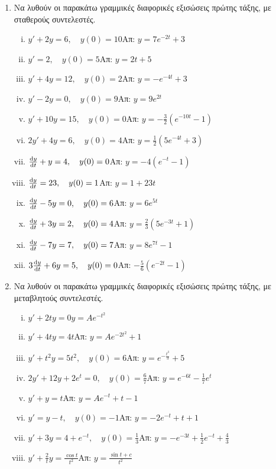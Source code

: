 \documentclass[a4paper,12pt]{article}
\begin{document}
\begin{center}
\end{center}

\vspace{\baselineskip}


\begin{enumerate}

\item Να λυθούν οι παρακάτω γραμμικές διαφορικές εξισώσεις πρώτης τάξης, με σταθερούς συντελεστές.

\begin{enumerate}[i)]

\item $y'+2y=6,\quad y(0)=10$\hfill Απ: $y=7e^{-2t}+3$
\item $y'=2,\quad y(0)=5$\hfill Απ: $y=2t+5$
\item $y'+4y=12,\quad y(0)=2$\hfill Απ: $y=-e^{-4t}+3$
\item $y'-2y=0,\quad y(0)=9$\hfill Απ: $y=9e^{2t}$
\item $y'+10y=15,\quad y(0)=0$\hfill Απ: $y=-\frac{3}{2}(e^{-10t}-1)$
\item $2y'+4y=6,\quad y(0)=4$\hfill Απ: $y=\frac{1}{2}(5e^{-4t}+3)$
\item $\dv{y}{t}+y=4,\quad y(0)=0$\hfill Απ: $y=-4(e^{-t}-1)$
\item $\dv{y}{t}=23,\quad y(0)=1$\hfill Απ: $y=1+23t$
\item $\dv{y}{t}-5y=0,\quad y(0)=6$\hfill Απ: $y=6e^{5t}$
\item $\dv{y}{t}+3y=2,\quad y(0)=4$\hfill Απ: $y=\frac{2}{3}(5e^{-3t}+1)$
\item $\dv{y}{t}-7y=7,\quad y(0)=7$\hfill Απ: $y=8e^{7t}-1$
\item $3\dv{y}{t}+6y=5,\quad y(0)=0$\hfill Απ: $-\frac{5}{6}(e^{-2t}-1)$
\end{enumerate}

\item Να λυθούν οι παρακάτω γραμμικές διαφορικές εξισώσεις πρώτης τάξης, με μεταβλητούς συντελεστές.

\begin{enumerate}[i)]

\item $y'+2ty=0$\hfill $y=Ae^{-t^2}$
\item $y'+4ty=4t$\hfill Απ: $y=Ae^{-2t^2}+1$
\item $y'+t^2y=5t^2,\quad y(0)=6$\hfill Απ: $y=e^{-\frac{t^3}{3}}+5$
\item $2y'+12y+2e^t=0,\quad y(0)=\frac{6}{7}$\hfill Απ: $y=e^{-6t}-\frac{1}{7}e^t$
\item $y'+y=t$\hfill Απ: $y=Ae^{-t}+t-1$
\item $y'=y-t,\quad y(0)=-1$\hfill Απ: $y=-2e^{-t}+t+1$
\item $y'+3y=4+e^{-t},\quad y(0)=\frac{1}{3}$\hfill Απ: $y=-e^{-3t}+\frac{1}{2}e^{-t}+\frac{4}{3}$
\item $y'+\frac{2}{t}y=\frac{\cos t}{t^2}$\hfill Απ: $y=\frac{\sin t +c}{t^2}$


\end{enumerate}
\end{enumerate}
\end{document}
